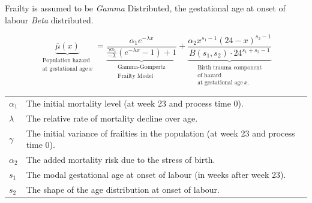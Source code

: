 \documentclass{beamer}
\begin{document}

\begin{frame}
\frametitle{\insertsection}

Frailty is assumed to be \emph{Gamma} Distributed, the gestational age at onset of labour \emph{Beta} distributed.

\begin{equation*}
  \underbrace{
    \overline{\mu}(x)
  }_{\substack{
    \text{Population hazard}\\ \text{at gestational age}~x
  }} =
  \underbrace{
    \frac {\alpha_1 e^{-\lambda x}} {\frac{\gamma \alpha_1} {-\lambda} (e^{-\lambda x} - 1) + 1}
  }_{\substack{
    \text{Gamma-Gompertz}\\ \text{Frailty Model}
  }} +
  \underbrace{
    \frac{\alpha_2 x^{s_1-1} (24-x)^{s_2-1}} {B(s_1,s_2) \cdot 24^{s_1+s_2-1}}
  }_{\substack{
    \text{Birth trauma component}\\ \text{of hazard}\\ \text{at gestational age}~x.
  }}
\end{equation*}

\small\centering
\begin{tabular}{p{1cm}p{7cm}}
  $\alpha_1$ & The initial mortality level (at week 23 and process time 0). \\
  $\lambda$ & The relative rate of mortality decline over age. \\
  $\gamma$ & The initial variance of frailties in the population (at week 23 and process time 0).\\
  $\alpha_2$ & The added mortality risk due to the stress of birth. \\
  $s_1$ & The modal gestational age at onset of labour (in weeks after week 23). \\
  $s_2$ & The shape of the age distribution at onset of labour. \\
\end{tabular}

\end{frame}

\end{document}
